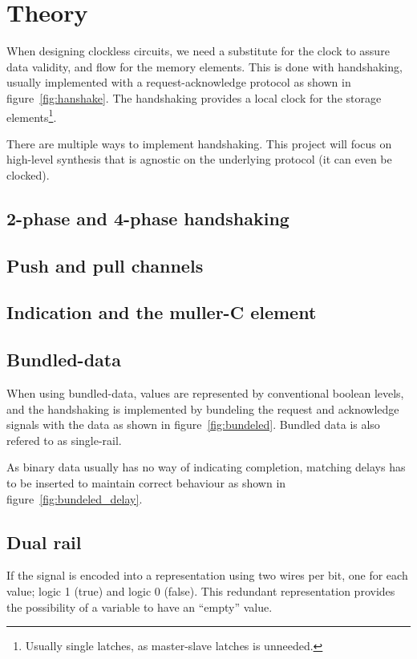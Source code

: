 \section{Theory}

When designing clockless circuits, we need a substitute for the clock
to assure data validity, and flow for the memory elements. This is
done with handshaking, usually implemented with a request-acknowledge
protocol as shown in figure~\ref{fig:hanshake}. The handshaking
provides a local clock for the storage elements\footnote{Usually
  single latches, as master-slave latches is unneeded.}.

There are multiple ways to implement handshaking. This project will
focus on high-level synthesis that is agnostic on the underlying
protocol (it can even be clocked). 

\subsection{2-phase and 4-phase handshaking}


\subsection{Push and pull channels}

\subsection{Indication and the muller-C element}

\subsection{Bundled-data}

When using bundled-data, values are represented by conventional
boolean levels, and the handshaking is implemented by bundeling the
request and acknowledge signals with the data as shown in
figure~\ref{fig:bundeled}. Bundled data is also refered to as
single-rail.

As binary data usually has no way of indicating completion, matching
delays has to be inserted to maintain correct behaviour as shown in
figure~\ref{fig:bundeled_delay}.

\subsection{Dual rail}

If the signal is encoded into a representation using two wires per
bit, one for each value; logic 1 (true) and logic 0 (false). This
redundant representation provides the possibility of a variable to
have an ``empty'' value. 

